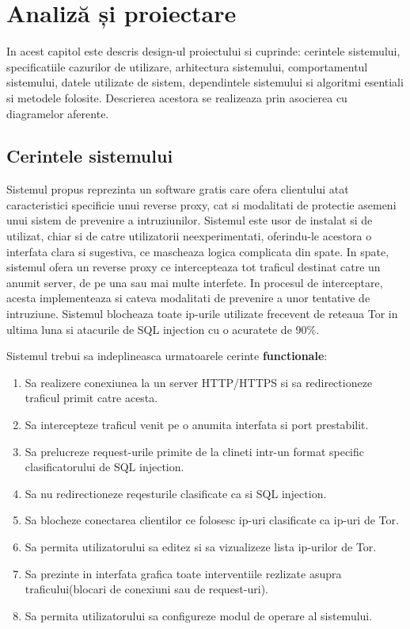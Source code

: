 \chapter{Analiză și proiectare}
\label{cap:analiza-si-proiectare}

In acest capitol este descris design-ul proiectului si cuprinde: cerintele sistemului, specificatiile cazurilor de utilizare, arhitectura sistemului, comportamentul sistemului, datele utilizate de sistem, dependintele sistemului si algoritmi esentiali si metodele folosite. Descrierea acestora se realizeaza prin asocierea cu diagramelor aferente.

\section{Cerintele sistemului}

Sistemul propus \textit{\thesistitle} reprezinta un software gratis care ofera clientului atat caracteristici specificie unui reverse proxy, cat si modalitati de protectie asemeni unui sistem de prevenire a intruziunilor.
Sistemul este usor de instalat si de utilizat, chiar si de catre utilizatorii neexperimentati, oferindu-le acestora o interfata clara si sugestiva, ce mascheaza logica complicata din spate. In spate, sistemul ofera un reverse proxy ce intercepteaza tot traficul destinat catre un anumit server, de pe una sau mai multe interfete. In procesul de interceptare, acesta implementeaza si cateva modalitati de prevenire a unor tentative de intruziune. Sistemul blocheaza toate ip-urile utilizate frecevent de reteaua Tor in ultima luna si atacurile de SQL injection cu o acuratete de 90\%.

Sistemul trebui sa indeplineasca urmatoarele cerinte \textbf{functionale}:
\begin{enumerate}
	\item Sa realizere conexiunea la un server HTTP/HTTPS si sa redirectioneze traficul primit catre acesta.
	\item Sa intercepteze traficul venit pe o anumita interfata si port prestabilit.
	\item Sa prelucreze request-urile primite de la clineti intr-un format specific clasificatorului de SQL injection.
	\item Sa nu redirectioneze reqesturile clasificate ca si SQL injection.
	\item Sa blocheze conectarea clientilor ce folosesc ip-uri clasificate ca ip-uri de Tor.
	\item Sa permita utilizatorului sa editez si sa vizualizeze lista ip-urilor de Tor.
	\item Sa prezinte in interfata grafica toate interventiile rezlizate asupra traficului(blocari de conexiuni sau de request-uri).
	\item Sa permita utilizatorului sa configureze modul de operare al sistemului.
\end{enumerate}

